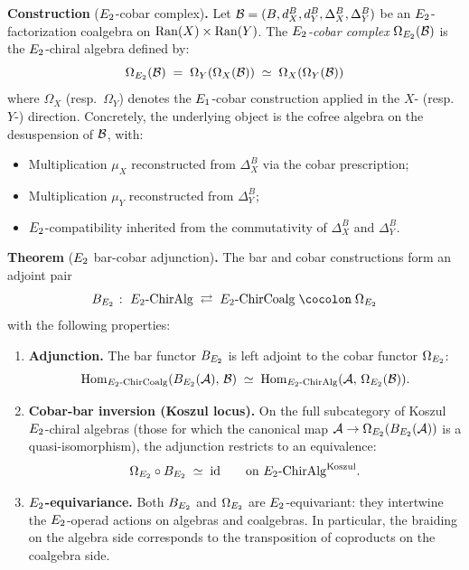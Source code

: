 \medskip
\noindent\textbf{Construction} ($E_2$-cobar complex)\textbf{.}\;
Let $\mathcal{B} = (B, d_X^B, d_Y^B, \Delta_X^B, \Delta_Y^B)$ be an
$E_2$-factorization coalgebra on $\mathrm{Ran}(X) \times \mathrm{Ran}(Y)$. The
\emph{$E_2$-cobar complex} $\Omega_{E_2}(\mathcal{B})$ is the
$E_2$-chiral algebra defined by:
\begin{equation}\label{eq:cobar-e2}
 \Omega_{E_2}(\mathcal{B})
 \;=\;
 \Omega_Y(\Omega_X(\mathcal{B}))
 \;\simeq\;
 \Omega_X(\Omega_Y(\mathcal{B}))
\end{equation}
where $\Omega_X$ (resp.\ $\Omega_Y$) denotes the $E_1$-cobar
construction applied in the $X$- (resp.\ $Y$-) direction. Concretely,
the underlying object is the cofree algebra on the desuspension of
$\mathcal{B}$, with:
\begin{itemize}
 \item Multiplication $\mu_X$ reconstructed from $\Delta_X^B$ via
 the cobar prescription;
 \item Multiplication $\mu_Y$ reconstructed from $\Delta_Y^B$;
 \item $E_2$-compatibility inherited from the commutativity of
 $\Delta_X^B$ and $\Delta_Y^B$.
\end{itemize}

\medskip
\noindent\textbf{Theorem} ($E_2$ bar-cobar adjunction)\textbf{.}\;
The bar and cobar constructions form an adjoint pair
\[
 B_{\Etwo}
 \;\colon\;
 \Etwo\text{-}\mathrm{ChirAlg}
 \;\rightleftarrows\;
 \Etwo\text{-}\mathrm{ChirCoalg}
 \;\cocolon\;
 \Omega_{\Etwo}
\]
with the following properties:
\begin{enumerate}[label=(\roman*)]
 \item \textbf{Adjunction.} The bar functor $B_{E_2}$ is left
 adjoint to the cobar functor $\Omega_{E_2}$:
 \[
 \mathrm{Hom}_{E_2\text{-}\mathrm{ChirCoalg}}
 (B_{E_2}(\mathcal{A}),\, \mathcal{B})
 \;\simeq\;
 \mathrm{Hom}_{E_2\text{-}\mathrm{ChirAlg}}
 (\mathcal{A},\, \Omega_{E_2}(\mathcal{B})).
 \]

 \item \textbf{Cobar-bar inversion (Koszul locus).}
 On the full subcategory of Koszul $E_2$-chiral algebras
 (those for which the canonical map
 $\mathcal{A} \to \Omega_{E_2}(B_{E_2}(\mathcal{A}))$ is a quasi-isomorphism),
 the adjunction restricts to an equivalence:
 \[
 \Omega_{E_2} \circ B_{E_2}
 \;\simeq\; \mathrm{id}
 \qquad\text{on $E_2$-$\mathrm{ChirAlg}^{\mathrm{Koszul}}$}.
 \]

 \item \textbf{$E_2$-equivariance.}
 Both $B_{E_2}$ and $\Omega_{E_2}$ are $E_2$-equivariant:
 they intertwine the $E_2$-operad actions on algebras and
 coalgebras. In particular, the braiding on the algebra side
 corresponds to the transposition of coproducts on the coalgebra
 side.
\end{enumerate}

